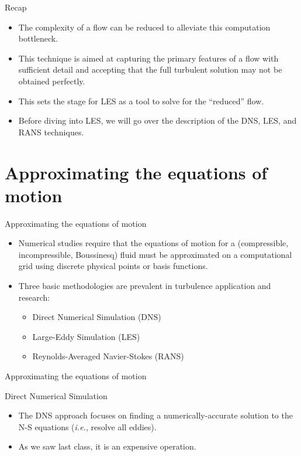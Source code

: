 
\begin{frame}{Recap}

\begin{itemize}
	\item The complexity of a flow can be reduced to alleviate this computation bottleneck.
	\item This technique is aimed at capturing the primary features of a flow with sufficient detail and accepting that the full turbulent solution may not be obtained perfectly.
	\item This sets the stage for LES as a tool to solve for the ``reduced'' flow.
	\item Before diving into LES, we will go over the description of the DNS, LES, and RANS techniques.
\end{itemize}
\end{frame}

\section{Approximating the equations of motion} %
\begin{frame}{Approximating the equations of motion}

\begin{itemize}
	\item Numerical studies require that the equations of motion for a (compressible, incompressible, Boussinesq) fluid must be approximated on a computational grid using discrete physical points or basis functions.
	\item Three basic methodologies are prevalent in turbulence application and research:
	\begin{itemize}
		\item Direct Numerical Simulation (DNS)
		\item Large-Eddy Simulation (LES)
		\item Reynolds-Averaged Navier-Stokes (RANS)
	\end{itemize}
\end{itemize}
\end{frame}


\begin{frame}{Approximating the equations of motion}

Direct Numerical Simulation
\begin{itemize}
	\item The DNS approach focuses on finding a numerically-accurate solution to the N-S equations (\textit{i.e.}, resolve all eddies).
	\item As we saw last class, it is an expensive operation.
\end{itemize}
\end{frame}

